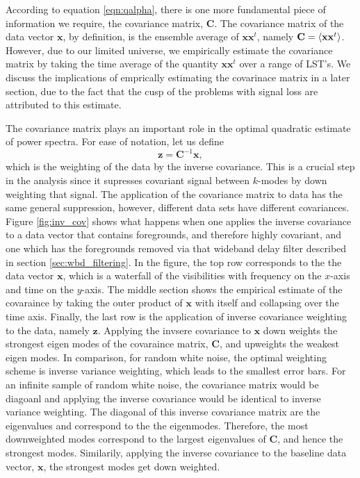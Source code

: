 \documentclass[twocolumn,numberedappendix]{emulateapj} \shorttitle{PSA64}
\newcommand{\x}{\mathbf{x}} \newcommand{\xhat}{\hat{\mathbf{x}}}
\newcommand{\C}{\mathbf{C}} \newcommand{\Q}{\mathbf{Q}}
\begin{document}
According to equation \ref{eqn:qalpha}, there is one more fundamental piece of
information we require, the covariance matrix, $\mathbf{C}$. The covariance
matrix of the data vector $\x$, by definition, is the ensemble average of
$\x\x^{t}$, namely $\mathbf{C} = \expval{\x\x^{t}}$. However, due to our limited
universe, we empirically estimate the covariance matrix by taking the time average of the
quantity $\x\x^{t}$ over a range of LST's. We discuss the implications of
emprically estimating the covarinace matrix in a later section, due to the fact
that the cusp of the problems with signal loss are attributed to this estimate.

The covariance matrix plays an important role in the optimal quadratic estimate
of power spectra. For ease of notation, let us define 
\begin{equation}\label{eqn:z}
    \mathbf{z} =  \mathbf{C}^{-1}\mathbf{x},
\end{equation}
which is the weighting of the data by the inverse covariance. This is a crucial
step in the analysis since it supresses covariant signal between $k$-modes by
down weighting that signal. The application of the covariance matrix to data has
the same general suppression, however, different data sets have different
covariances. Figure  \ref{fig:inv_cov} shows what happens when one applies the
inverse covariance to a data vector that contains foregrounds, and therefore
highly covariant,  and one which has the foregrounds removed via that wideband
delay filter described in section \ref{sec:wbd_filtering}.  In the figure, the
top row corresponds to the the data vector $\mathbf{x}$, which is a waterfall of
the visibilities with frequency on the $x$-axis and time on the $y$-axis. The
middle section shows the empirical estimate of the covaraince by taking the
outer product of $\x$ with itself and collapsing over the time axis. Finally,
the last row is the application of inverse covariance weighting to the data,
namely $\mathbf{z}$.  Applying the invsere covariance to $\x$ down weights the
strongest eigen modes of the covaraince matrix, $\mathbf{C}$, and upweights the
weakest eigen modes. In comparison, for random white noise, the optimal
weighting scheme is inverse variance weighting, which leads to the smallest
error bars. For an infinite sample of random white noise, the covariance matrix
would be diagoanl and applying the inverse covariance would be identical to
inverse variance weighting. The diagonal of this inverse covariance matrix are
the eigenvalues and correspond to the the eigenmodes. Therefore, the most
downweighted modes correspond to the largest eigenvalues of $\C$, and hence the
strongest modes.  Similarily, applying the inverse covariance to the baseline
data vector, $\x$, the strongest modes get down weighted. 
\end{document}
